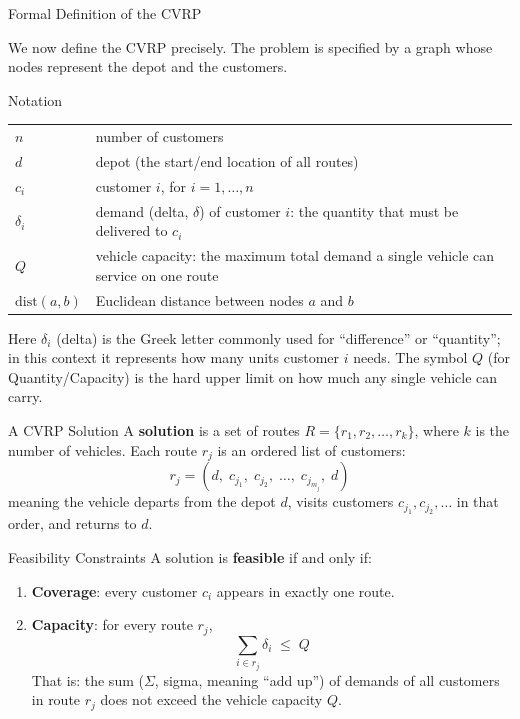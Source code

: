 \documentclass[aspectratio=169,10pt]{beamer}
\begin{document}
\begin{frame}[allowframebreaks]{Formal Definition of the CVRP}

  We now define the CVRP precisely.  The problem is specified by a graph
  whose nodes represent the depot and the customers.

  \bigskip
  \begin{block}{Notation}
    \begin{tabular}{@{}ll}
      $n$           & number of customers \\
      $d$           & depot (the start/end location of all routes) \\
      $c_i$         & customer $i$, for $i = 1, \ldots, n$ \\
      $\delta_i$    & demand (delta, $\delta$) of customer $i$: the
                       quantity that must be delivered to $c_i$ \\
      $Q$           & vehicle capacity: the maximum total demand a
                       single vehicle can service on one route \\
      $\mathrm{dist}(a, b)$ & Euclidean distance between nodes $a$ and $b$ \\
    \end{tabular}
  \end{block}

  \medskip
  Here $\delta_i$ (delta) is the Greek letter commonly used for ``difference''
  or ``quantity''; in this context it represents how many units customer $i$
  needs.  The symbol $Q$ (for Quantity/Capacity) is the hard upper limit
  on how much any single vehicle can carry.

  \framebreak

  \begin{block}{A CVRP Solution}
    A \textbf{solution} is a set of routes
    $R = \{r_1, r_2, \ldots, r_k\}$, where $k$ is the number of vehicles.
    Each route $r_j$ is an ordered list of customers:
    \[
      r_j = (d,\; c_{j_1},\; c_{j_2},\; \ldots,\; c_{j_{m_j}},\; d)
    \]
    meaning the vehicle departs from the depot $d$, visits customers
    $c_{j_1}, c_{j_2}, \ldots$ in that order, and returns to $d$.
  \end{block}

  \begin{block}{Feasibility Constraints}
    A solution is \textbf{feasible} if and only if:
    \begin{enumerate}
      \item \textbf{Coverage}: every customer $c_i$ appears in exactly one route.
      \item \textbf{Capacity}: for every route $r_j$,
        \[
          \sum_{i \in r_j} \delta_i \;\leq\; Q
        \]
        That is: the sum ($\Sigma$, sigma, meaning ``add up'') of demands of all
        customers in route $r_j$ does not exceed the vehicle capacity $Q$.
    \end{enumerate}
  \end{block}


\end{frame}
\end{document}
